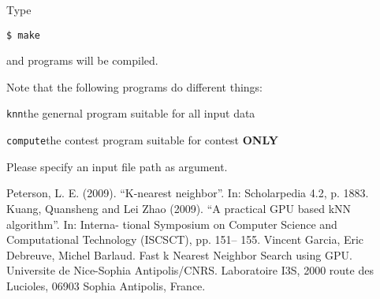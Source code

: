 \documentclass[11pt, a4paper]{article}
\begin{document}
Type

\texttt{\$ make}

and programs will be compiled.

{\color{red} Note that the following programs do different things:

\texttt{knn}\quad the genernal program suitable for all input data

\texttt{compute}\quad the contest program suitable for contest \textbf{ONLY}

}

Please specify an input file path as argument.

\begin{thebibliography}{99}
     Peterson, L. E. (2009). “K-nearest neighbor”. In: Scholarpedia 4.2, p. 1883.
     Kuang, Quansheng and Lei Zhao (2009). “A practical GPU based kNN algorithm”. In: Interna- tional Symposium on Computer Science and Computational Technology (ISCSCT), pp. 151– 155.
     Vincent Garcia, Eric Debreuve, Michel Barlaud. Fast k Nearest Neighbor Search using GPU. Universite de Nice-Sophia Antipolis/CNRS. Laboratoire I3S, 2000 route des Lucioles, 06903 Sophia Antipolis, France.
\end{thebibliography}
\end{document}
